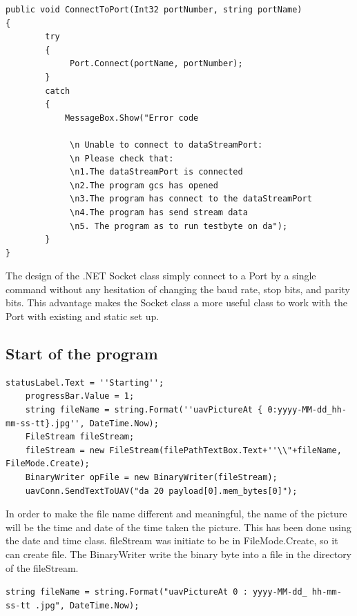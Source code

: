 \begin{lstlisting}[caption={connect to port},label=lst:connectT]
public void ConnectToPort(Int32 portNumber, string portName)
{
        try            
        {
             Port.Connect(portName, portNumber);                
        }            
        catch 
        {            
            MessageBox.Show("Error code
                
             \n Unable to connect to dataStreamPort:
             \n Please check that:                
             \n1.The dataStreamPort is connected                 
             \n2.The program gcs has opened                 
             \n3.The program has connect to the dataStreamPort                
             \n4.The program has send stream data                
             \n5. The program as to run testbyte on da");                
        }            
}
        \end{lstlisting}

        
	The design of the .NET Socket class simply connect to a Port by a single command without any hesitation of changing the baud rate, stop bits, and parity bits. This advantage makes the Socket class a more useful class to work with the Port with existing and static set up. 

\subsection{Start of the program}

\begin{lstlisting}[caption={Start of the program}, label=lst:payload_shared_mem_set]
	statusLabel.Text = ''Starting'';   
	progressBar.Value = 1;   
	string fileName = string.Format(''uavPictureAt { 0:yyyy-MM-dd_hh-mm-ss-tt}.jpg'', DateTime.Now);
	FileStream fileStream;
	fileStream = new FileStream(filePathTextBox.Text+''\\"+fileName, FileMode.Create);      
	BinaryWriter opFile = new BinaryWriter(fileStream);
	uavConn.SendTextToUAV("da 20 payload[0].mem_bytes[0]");      
 \end{lstlisting}
             In order to make the file name different and meaningful, the name of the picture will be the time and date of the time taken the picture. This has been done using the date and time class. fileStream was initiate to be in FileMode.Create, so it can create file. The BinaryWriter write the binary byte into a file in the directory of the fileStream. 
            
\texttt{string fileName = string.Format("uavPictureAt{ 0 : yyyy-MM-dd\_ hh-mm-ss-tt}
 .jpg", DateTime.Now);   }  
        
